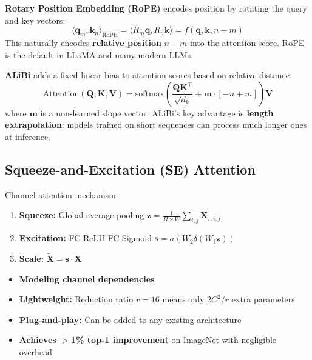 \textbf{Rotary Position Embedding (RoPE)} \cite{su2021roformer} encodes position by rotating the query and key vectors:
\begin{equation}
\langle \mathbf{q}_m, \mathbf{k}_n \rangle_{\text{RoPE}} = \langle R_m \mathbf{q}, R_n \mathbf{k} \rangle = f(\mathbf{q}, \mathbf{k}, n - m)
\end{equation}
This naturally encodes \textbf{relative position} $n - m$ into the attention score. RoPE is the default in LLaMA and many modern LLMs.

\textbf{ALiBi} \cite{press2022train} adds a fixed linear bias to attention scores based on relative distance:
\begin{equation}
\text{Attention}(\mathbf{Q}, \mathbf{K}, \mathbf{V}) = \text{softmax}\left(\frac{\mathbf{Q}\mathbf{K}^\top}{\sqrt{d_k}} + \mathbf{m} \cdot [-n+m]\right)\mathbf{V}
\end{equation}
where $\mathbf{m}$ is a non-learned slope vector. ALiBi's key advantage is \textbf{length extrapolation}: models trained on short sequences can process much longer ones at inference.

\subsection{Squeeze-and-Excitation (SE) Attention}

Channel attention mechanism \cite{hu2018squeeze}:
\begin{enumerate}
    \item \textbf{Squeeze:} Global average pooling $\mathbf{z} = \frac{1}{H\times W}\sum_{i,j}\mathbf{X}_{:,i,j}$
    \item \textbf{Excitation:} FC-ReLU-FC-Sigmoid $\mathbf{s} = \sigma(W_2\delta(W_1\mathbf{z}))$
    \item \textbf{Scale:} $\tilde{\mathbf{X}} = \mathbf{s} \cdot \mathbf{X}$
\end{enumerate}

\begin{properties}[SE Block]
\begin{itemize}
    \item \textbf{Modeling channel dependencies}
    \item \textbf{Lightweight:} Reduction ratio $r = 16$ means only $2C^2/r$ extra parameters
    \item \textbf{Plug-and-play:} Can be added to any existing architecture
    \item \textbf{Achieves $>$1\% top-1 improvement} on ImageNet with negligible overhead
\end{itemize}
\end{properties}

